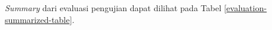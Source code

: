 \textit{Summary} dari evaluasi pengujian dapat dilihat pada Tabel \ref{evaluation-summarized-table}.

